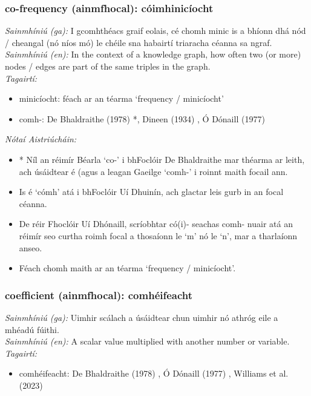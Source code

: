 \subsubsection*{co-frequency (ainmfhocal): cóimhinicíocht}
 \noindent \textit{Sainmhíniú (ga):} I gcomhthéacs graif eolais, cé chomh minic is a bhíonn dhá nód / cheangal (nó níos mó) le chéile sna habairtí triaracha céanna sa ngraf.
\\
 \noindent \textit{Sainmhíniú (en):} In the context of a knowledge graph, how often two (or more) nodes / edges are part of the same triples in the graph.
\\
 \noindent \textit{Tagairtí:}
\begin{itemize}
	\item minicíocht: féach ar an téarma `frequency / minicíocht'
	\item comh-: De Bhaldraithe (1978) \cite{de-bhaldraithe}*, Dineen (1934) \cite{dineen}, Ó Dónaill (1977) \cite{odonaill}
\end{itemize}

 \noindent \textit{Nótaí Aistriúcháin:}
\begin{itemize}
	\item * Níl an réimír Béarla `co-' i bhFoclóir De Bhaldraithe mar théarma ar leith, ach úsáidtear é (agus a leagan Gaeilge `comh-' i roinnt maith focail ann.
	\item Is é `cómh' atá i bhFoclóir Uí Dhuinín, ach glactar leis gurb in an focal céanna.
	\item De réir Fhoclóir Uí Dhónaill, scríobhtar có(i)- seachas comh- nuair atá an réimír seo curtha roimh focal a thosaíonn le `m' nó le `n', mar a tharlaíonn anseo.
	\item Féach chomh maith ar an téarma `frequency / minicíocht'.
\end{itemize}


\subsubsection*{coefficient (ainmfhocal): comhéifeacht}
 \noindent \textit{Sainmhíniú (ga):} Uimhir scálach a úsáidtear chun uimhir nó athróg eile a mhéadú fúithi.
\\
 \noindent \textit{Sainmhíniú (en):} A scalar value multiplied with another number or variable.
\\
 \noindent \textit{Tagairtí:}
\begin{itemize}
	\item comhéifeacht: De Bhaldraithe (1978) \cite{de-bhaldraithe}, Ó Dónaill (1977) \cite{odonaill}, Williams et al. (2023) \cite{storchiste}
\end{itemize}

